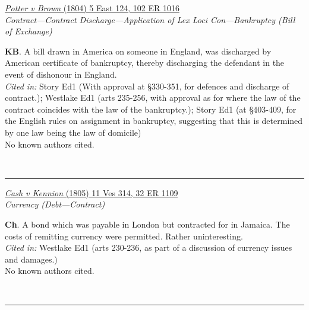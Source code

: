\documentclass[twoside]{article}
\begin{document}
        \begin{small}
        \begin{center}
        \href{https://heinonline.org/HOL/P?h=hein.engrep/engrf0102&i=1020}{\textit{Potter v Brown} (1804) 5 East 124, 102 ER 1016} \label{38} \\ 
\textit{Contract---Contract Discharge---Application of Lex Loci Con---Bankruptcy (Bill of Exchange)}\\
        \end{center}
        \textbf{KB}. A bill drawn in America on someone in England, was discharged by American certificate of bankruptcy, thereby discharging the defendant in the event of dishonour in England.\\\textit{Cited in: }Story Ed1 (With approval at §330-351, for defences and discharge of contract.); Westlake Ed1 (arts 235-256, with approval as for where the law of the contract coincides with the law of the bankruptcy.); Story Ed1 (at §403-409, for the English rules on assignment in bankruptcy, suggesting that this is determined by one law being the law of domicile)\\No known authors cited.
        \end{small}\\
        \rule{\textwidth}{0.5pt}
        

        \begin{small}
        \begin{center}
        \href{https://heinonline.org/HOL/P?h=hein.engrep/engrc0032&i=1117}{\textit{Cash v Kennion} (1805) 11 Ves 314, 32 ER 1109} \label{37} \\ 
\textit{Currency (Debt---Contract)}\\
        \end{center}
        \textbf{Ch}. A bond which was payable in London but contracted for in Jamaica. The costs of remitting currency were permitted. Rather uninteresting.\\\textit{Cited in: }Westlake Ed1 (arts 230-236, as part of a discussion of currency issues and damages.)\\No known authors cited.
        \end{small}\\
        \rule{\textwidth}{0.5pt}
        
\end{document}
